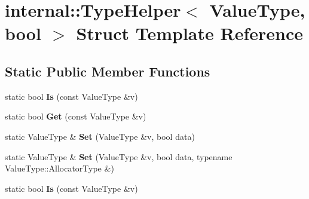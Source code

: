 \hypertarget{structinternal_1_1_type_helper_3_01_value_type_00_01bool_01_4}{}\section{internal\+:\+:Type\+Helper$<$ Value\+Type, bool $>$ Struct Template Reference}
\label{structinternal_1_1_type_helper_3_01_value_type_00_01bool_01_4}
\subsection*{Static Public Member Functions}
\begin{DoxyCompactItemize}
\item 
static bool {\bfseries Is} (const Value\+Type \&v)\hypertarget{structinternal_1_1_type_helper_3_01_value_type_00_01bool_01_4_aa73fb8b4ed649706f7f9165401f89c27}{}\label{structinternal_1_1_type_helper_3_01_value_type_00_01bool_01_4_aa73fb8b4ed649706f7f9165401f89c27}

\item 
static bool {\bfseries Get} (const Value\+Type \&v)\hypertarget{structinternal_1_1_type_helper_3_01_value_type_00_01bool_01_4_aed612b233e5985d049248b414fb0034a}{}\label{structinternal_1_1_type_helper_3_01_value_type_00_01bool_01_4_aed612b233e5985d049248b414fb0034a}

\item 
static Value\+Type \& {\bfseries Set} (Value\+Type \&v, bool data)\hypertarget{structinternal_1_1_type_helper_3_01_value_type_00_01bool_01_4_a4bfa644e57e7d725468ed78103c1579a}{}\label{structinternal_1_1_type_helper_3_01_value_type_00_01bool_01_4_a4bfa644e57e7d725468ed78103c1579a}

\item 
static Value\+Type \& {\bfseries Set} (Value\+Type \&v, bool data, typename Value\+Type\+::\+Allocator\+Type \&)\hypertarget{structinternal_1_1_type_helper_3_01_value_type_00_01bool_01_4_a01a2bdf4117fb767c8d703be9e0f5f1d}{}\label{structinternal_1_1_type_helper_3_01_value_type_00_01bool_01_4_a01a2bdf4117fb767c8d703be9e0f5f1d}

\item 
static bool {\bfseries Is} (const Value\+Type \&v)\hypertarget{structinternal_1_1_type_helper_3_01_value_type_00_01bool_01_4_aa73fb8b4ed649706f7f9165401f89c27}{}\label{structinternal_1_1_type_helper_3_01_value_type_00_01bool_01_4_aa73fb8b4ed649706f7f9165401f89c27}


\end{DoxyCompactItemize}

